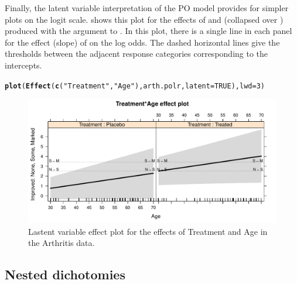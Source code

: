 \documentclass[11pt]{book}\usepackage[]{graphicx}\usepackage[]{color}
\makeatletter
\newcommand{\hlnum}[1]{\textcolor[rgb]{0.686,0.059,0.569}{#1}}%
\newcommand{\hlstr}[1]{\textcolor[rgb]{0.192,0.494,0.8}{#1}}%
\newcommand{\hlstd}[1]{\textcolor[rgb]{0.345,0.345,0.345}{#1}}%
\newcommand{\hlkwc}[1]{\textcolor[rgb]{0.333,0.667,0.333}{#1}}%
\newcommand{\hlkwd}[1]{\textcolor[rgb]{0.737,0.353,0.396}{\textbf{#1}}}%
\newenvironment{kframe}{%
 \def\at@end@of@kframe{}%
 \ifinner\ifhmode%
  \def\at@end@of@kframe{\end{minipage}}%
  \begin{minipage}{\columnwidth}%
 \fi\fi%
 \def\FrameCommand##1{\hskip\@totalleftmargin \hskip-\fboxsep
 \colorbox{shadecolor}{##1}\hskip-\fboxsep
     \hskip-\linewidth \hskip-\@totalleftmargin \hskip\columnwidth}%
 \MakeFramed {\advance\hsize-\width
   \@totalleftmargin\z@ \linewidth\hsize
   \@setminipage}}%
 {\par\unskip\endMakeFramed%
 \at@end@of@kframe}
\newenvironment{knitrout}{}{} %
\renewenvironment{knitrout}{\small\renewcommand{\baselinestretch}{.85}}{} %
\makeatother
\begin{document}
Finally, the latent variable interpretation of the PO model provides for simpler plots on the
logit scale.   shows this plot for the effects of 
 and  (collapsed over )
produced with the argument
 to .  In this plot, there is a single line in each panel
for the effect (slope) of  on the log odds.  The dashed horizontal lines
give the thresholds between the adjacent response categories corresponding to the
intercepts.
\begin{knitrout}
\color{fgcolor}\begin{kframe}
\begin{alltt}
\hlkwd{plot}\hlstd{(}\hlkwd{Effect}\hlstd{(}\hlkwd{c}\hlstd{(}\hlstr{"Treatment"}\hlstd{,} \hlstr{"Age"}\hlstd{), arth.polr,} \hlkwc{latent}\hlstd{=}\hlnum{TRUE}\hlstd{),} \hlkwc{lwd}\hlstd{=}\hlnum{3}\hlstd{)}
\end{alltt}
\end{kframe}\begin{figure}[!htbp]


\centerline{\includegraphics[width=.9\textwidth]{ch07/fig/arth-po-eff3-1} }

\caption[Lastent variable effect plot for the effects of Treatment and Age in the Arthritis data]{Lastent variable effect plot for the effects of Treatment and Age in the Arthritis data.\label{fig:arth-po-eff3}}
\end{figure}


\end{knitrout}



\subsection{Nested dichotomies}\label{sec:nested}
\end{document}
